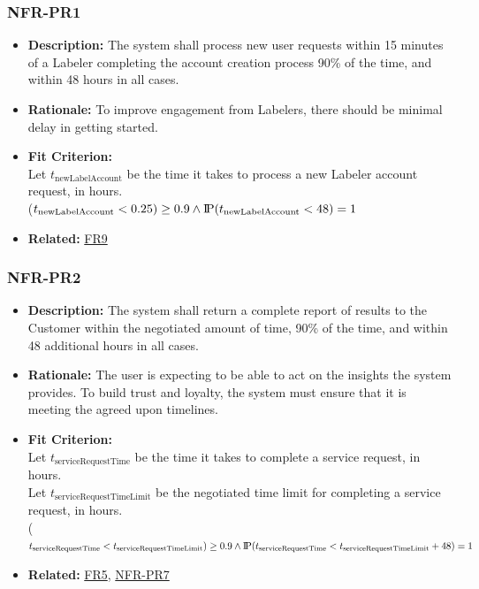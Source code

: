 \documentclass[12pt]{article}
\newcommand{\probP}{\text{I\kern-0.15em P}}
\begin{document}
\subsubsection*{NFR-PR1}
\label{sec:PR1}
\begin{itemize}
  \item \textbf{Description:} The system shall process new user requests within 15 minutes of a Labeler  completing the account creation process 90\% of the time, and within 48 hours in all cases. 
  \item \textbf{Rationale:} To improve engagement from Labelers, there should be minimal delay in getting started.
  \item \textbf{Fit Criterion:}\\ Let $t_{\text{newLabelAccount}}$ be the time it takes to process a new Labeler account request, in hours.\\ \probP($t_{\text{newLabelAccount}} < 0.25) \geq 0.9 \wedge \probP(t_{\text{newLabelAccount}} < 48) = 1 $
  \item \textbf{Related:} \hyperref[sec:FR9]{FR9}
\end{itemize}

\subsubsection*{NFR-PR2}
\label{sec:PR2}
\begin{itemize}
  \item \textbf{Description:} The system shall return a complete report of results to the Customer within the negotiated amount of time, 90\% of the time, and within 48 additional hours in all cases.
  \item \textbf{Rationale:} The user is expecting to be able to act on the insights the system provides. To build trust and loyalty, the system must ensure that it is meeting the agreed upon timelines.
  \item \textbf{Fit Criterion:}\\ Let $t_{\text{serviceRequestTime}}$ be the time it takes to complete a service request, in hours.\\
  Let $t_{\text{serviceRequestTimeLimit}}$ be the negotiated time limit for completing a service request, in hours.\\ \probP($t_{\text{serviceRequestTime}} < t_{\text{serviceRequestTimeLimit}}) \geq 0.9\\ \wedge \probP(t_{\text{serviceRequestTime}} < t_{\text{serviceRequestTimeLimit}}+48) = 1 $
  \item \textbf{Related:} \hyperref[sec:FR5]{FR5},  \hyperref[sec:PR7]{NFR-PR7}
\end{itemize}
\end{document}
